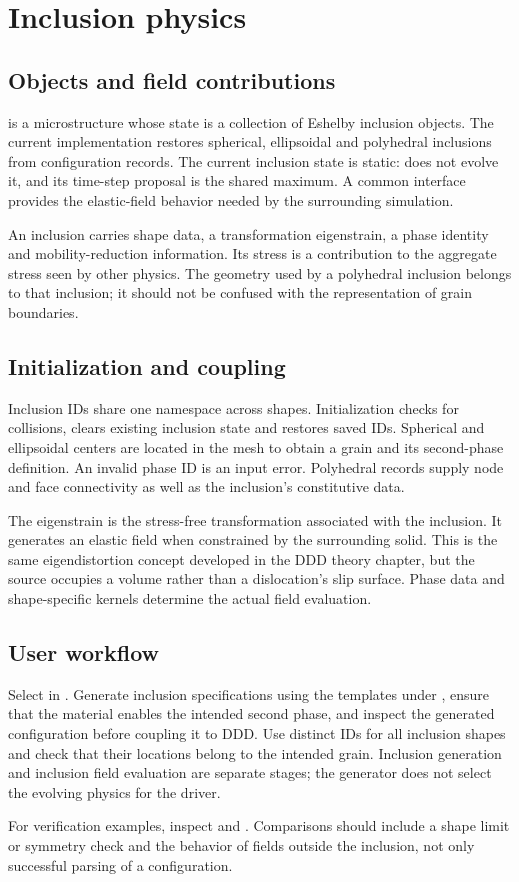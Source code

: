\chapter{Inclusion physics}\label{chap:inclusions}
\section{Objects and field contributions}
 is a microstructure whose state is a collection of Eshelby inclusion objects. The current implementation restores spherical, ellipsoidal and polyhedral inclusions from configuration records. The current inclusion state is static:  does not evolve it, and its time-step proposal is the shared maximum. A common  interface provides the elastic-field behavior needed by the surrounding simulation.

An inclusion carries shape data, a transformation eigenstrain, a phase identity and mobility-reduction information. Its stress is a contribution to the aggregate stress seen by other physics. The geometry used by a polyhedral inclusion belongs to that inclusion; it should not be confused with the  representation of grain boundaries.

\section{Initialization and coupling}
Inclusion IDs share one namespace across shapes. Initialization checks for collisions, clears existing inclusion state and restores saved IDs. Spherical and ellipsoidal centers are located in the mesh to obtain a grain and its second-phase definition. An invalid phase ID is an input error. Polyhedral records supply node and face connectivity as well as the inclusion's constitutive data.

The eigenstrain is the stress-free transformation associated with the inclusion. It generates an elastic field when constrained by the surrounding solid. This is the same eigendistortion concept developed in the DDD theory chapter, but the source occupies a volume rather than a dislocation's slip surface. Phase data and shape-specific kernels determine the actual field evaluation.

\section{User workflow}
Select  in . Generate inclusion specifications using the templates under , ensure that the material enables the intended second phase, and inspect the generated configuration before coupling it to DDD. Use distinct IDs for all inclusion shapes and check that their locations belong to the intended grain. Inclusion generation and inclusion field evaluation are separate stages; the generator does not select the evolving physics for the driver.

For verification examples, inspect  and . Comparisons should include a shape limit or symmetry check and the behavior of fields outside the inclusion, not only successful parsing of a configuration.

